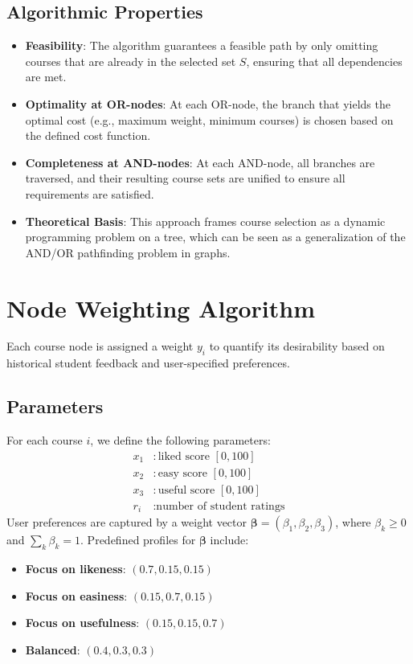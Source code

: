 \documentclass[11pt]{article}
\begin{document}
\subsection{Algorithmic Properties}
\begin{itemize}
    \item \textbf{Feasibility}: The algorithm guarantees a feasible path by only omitting courses that are already in the selected set $S$, ensuring that all dependencies are met.
    \item \textbf{Optimality at OR-nodes}: At each OR-node, the branch that yields the optimal cost (e.g., maximum weight, minimum courses) is chosen based on the defined cost function.
    \item \textbf{Completeness at AND-nodes}: At each AND-node, all branches are traversed, and their resulting course sets are unified to ensure all requirements are satisfied.
    \item \textbf{Theoretical Basis}: This approach frames course selection as a dynamic programming problem on a tree, which can be seen as a generalization of the AND/OR pathfinding problem in graphs.
\end{itemize}

\section{Node Weighting Algorithm}

Each course node is assigned a weight $y_i$ to quantify its desirability based on historical student feedback and user-specified preferences.

\subsection{Parameters}

For each course $i$, we define the following parameters:
\begin{align*}
    x_1 &: \text{liked score } [0, 100]\\
    x_2 &: \text{easy score } [0, 100]\\
    x_3 &: \text{useful score } [0, 100]\\
    r_i &: \text{number of student ratings}
\end{align*}
User preferences are captured by a weight vector $\boldsymbol{\beta} = (\beta_1, \beta_2, \beta_3)$, where $\beta_k \geq 0$ and $\sum_k \beta_k = 1$. Predefined profiles for $\boldsymbol{\beta}$ include:
\begin{itemize}
    \item \textbf{Focus on likeness}: $(0.7, 0.15, 0.15)$
    \item \textbf{Focus on easiness}: $(0.15, 0.7, 0.15)$
    \item \textbf{Focus on usefulness}: $(0.15, 0.15, 0.7)$
    \item \textbf{Balanced}: $(0.4, 0.3, 0.3)$
\end{itemize}
\end{document}
